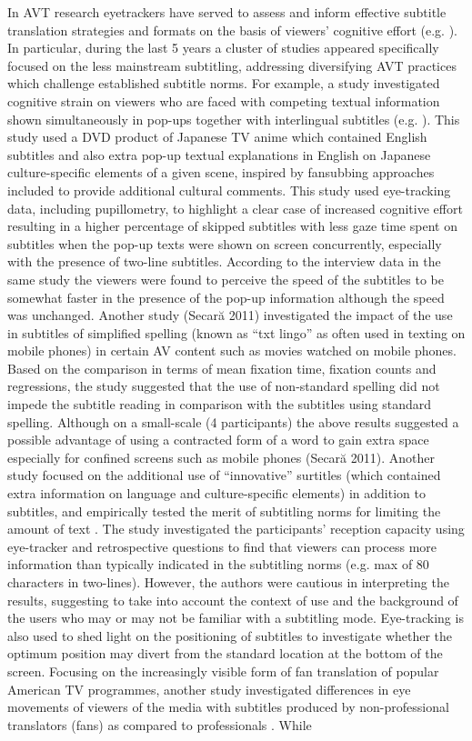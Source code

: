 \documentclass[output=paper]{langsci/langscibook}
\begin{document}
In AVT research eyetrackers have served to assess and inform effective subtitle translation strategies and formats on the basis of viewers' cognitive effort (e.g. \citealt{ghia2012}). In particular, during the last 5 years a cluster of studies appeared specifically focused on the less mainstream subtitling, addressing diversifying AVT practices which challenge established subtitle norms. For example, a study investigated cognitive strain on viewers who are faced with competing textual information shown simultaneously in pop-ups together with interlingual subtitles (e.g. \citealt{caffrey2009}). This study used a DVD product of Japanese TV anime which contained English subtitles and also extra pop-up textual explanations in English on Japanese culture-specific elements of a given scene, inspired by fansubbing approaches included to provide additional cultural comments.  This study used eye-tracking data, including pupillometry, to highlight a clear case of increased cognitive effort resulting in a higher percentage of skipped subtitles with less gaze time spent on subtitles when the pop-up texts were shown on screen concurrently, especially with the presence of two-line subtitles. According to the interview data in the same study the viewers were found to perceive the speed of the subtitles to be somewhat faster in the presence of the pop-up information although the speed was unchanged. Another study (Secar\u{a} 2011) investigated the impact of the use in subtitles of simplified spelling (known as ``txt lingo'' as often used in texting on mobile phones) in certain AV content such as movies watched on mobile phones. Based on the comparison in terms of mean fixation time, fixation counts and regressions, the study suggested that the use of non-standard spelling did not impede the subtitle reading in comparison with the subtitles using standard spelling. Although on a small-scale (4 participants) the above results suggested a possible advantage of using a contracted form of a word to gain extra space especially for confined screens such as mobile phones (Secar\u{a} 2011). Another study focused on the additional use of ``innovative'' surtitles (which contained extra information on language and culture-specific elements) in addition to subtitles, and empirically tested the merit of subtitling norms for limiting the amount of text \citep{Künzli2011}. The study investigated the participants' reception capacity using eye-tracker and retrospective questions to find that viewers can process more information than typically indicated in the subtitling norms (e.g. max of 80 characters in two-lines). However, the authors were cautious in interpreting the results, suggesting to take into account the context of use and the background of the users who may or may not be familiar with a subtitling mode.  Eye-tracking is also used to shed light on the positioning of subtitles \citep{Fox2013} to investigate whether the optimum position may divert from the standard location at the bottom of the screen. Focusing on the increasingly visible form of fan translation of popular American TV programmes, another study investigated differences in eye movements of viewers of the media with subtitles produced by non-professional translators (fans) as compared to professionals \citep{orrego2014}. While 
\end{document}
